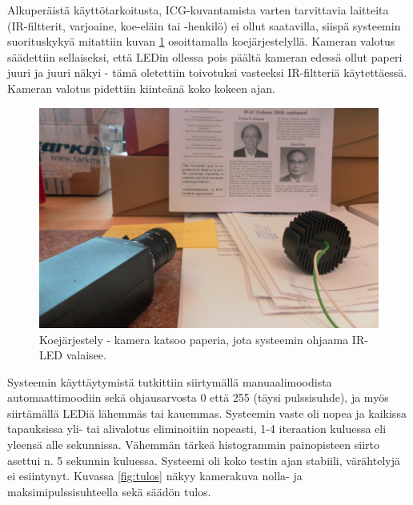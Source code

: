 \documentclass[finnish,12pt]{article}
\begin{document}
Alkuperäistä käyttötarkoitusta, ICG-kuvantamista varten tarvittavia laitteita (IR-filtterit, varjoaine, koe-eläin tai -henkilö) ei ollut saatavilla, siispä systeemin suorituskykyä mitattiin kuvan \ref{fig:koejarjestely} osoittamalla koejärjestelyllä. Kameran valotus säädettiin sellaiseksi, että LEDin ollessa pois päältä kameran edessä ollut paperi juuri ja juuri näkyi - tämä oletettiin toivotuksi vasteeksi IR-filtteriä käytettäessä. Kameran valotus pidettiin kiinteänä koko kokeen ajan.

\begin{figure}[h]
 \begin{center}
  \includegraphics[scale=0.4]{kuvat/koejarjestely.jpg}
  \caption{Koejärjestely - kamera katsoo paperia, jota systeemin ohjaama IR-LED valaisee.}
  \label{fig:koejarjestely}
 \end{center}

\end{figure}


Systeemin käyttäytymistä tutkittiin siirtymällä manuaalimoodista automaattimoodiin sekä ohjausarvosta 0 että 255 (täysi pulssisuhde), ja myös siirtämällä LEDiä lähemmäs tai kauemmas. Systeemin vaste oli nopea ja kaikissa tapauksissa yli- tai alivalotus eliminoitiin nopeasti, 1-4 iteraation kuluessa eli yleensä alle sekunnissa. Vähemmän tärkeä histogrammin painopisteen siirto asettui n. 5 sekunnin kuluessa. Systeemi oli koko testin ajan stabiili, värähtelyjä ei esiintynyt. Kuvassa \ref{fig:tulos} näkyy kamerakuva nolla- ja maksimipulssisuhteella sekä säädön tulos.
\end{document}
